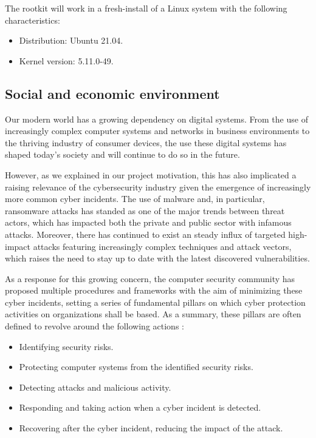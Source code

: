 The rootkit will work in a fresh-install of a Linux system with the following characteristics:
\begin{itemize}
\item Distribution: Ubuntu 21.04.
\item Kernel version: 5.11.0-49.
\end{itemize} 


\subsection{Social and economic environment}

Our modern world has a growing dependency on digital systems. From the use of increasingly complex computer systems and networks in business environments to the thriving industry of consumer devices, the use these digital systems has shaped today's society and will continue to do so in the future. 

However, as we explained in our project motivation, this has also implicated a raising relevance of the cybersecurity industry given the emergence of increasingly more common cyber incidents. The use of malware and, in particular, ransomware attacks has standed as one of the major trends between threat actors, which has impacted both the private and public sector with infamous attacks. Moreover, there has continued to exist an steady influx of targeted high-impact attacks featuring increasingly complex techniques and attack vectors, which raises the need to stay up to date with the latest discovered vulnerabilities.

As a response for this growing concern, the computer security community has proposed multiple procedures and frameworks with the aim of minimizing these cyber incidents, setting a series of fundamental pillars on which cyber protection activities on organizations shall be based. As a summary, these pillars are often defined to revolve around the following actions \cite{nisa_cyber}:
\begin{itemize}
\item Identifying security risks.
\item Protecting computer systems from the identified security risks.
\item Detecting attacks and malicious activity.
\item Responding and taking action when a cyber incident is detected.
\item Recovering after the cyber incident, reducing the impact of the attack.
\end{itemize} 

